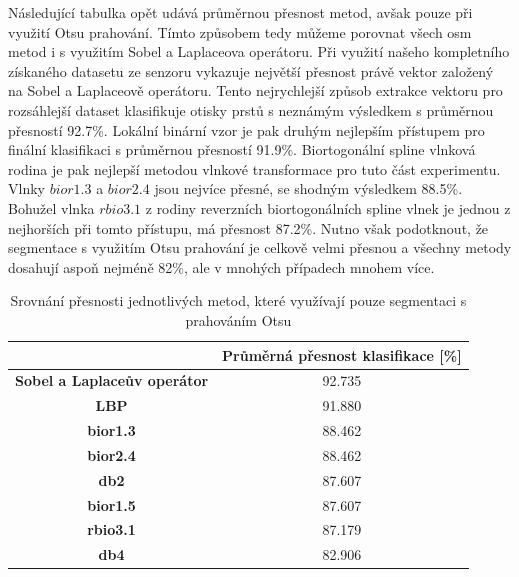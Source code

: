 Následující tabulka opět udává průměrnou přesnost metod, avšak pouze při využití Otsu prahování. Tímto způsobem tedy můžeme porovnat všech osm metod i s využitím Sobel a Laplaceova operátoru. Při využití našeho kompletního získaného datasetu ze senzoru vykazuje největší přesnost právě vektor založený na Sobel a Laplaceově operátoru. Tento nejrychlejší způsob extrakce vektoru pro rozsáhlejší dataset klasifikuje otisky prstů s neznámým výsledkem s průměrnou přesností 92.7\%. Lokální binární vzor je pak druhým nejlepším přístupem pro finální klasifikaci s průměrnou přesností 91.9\%. Biortogonální spline vlnková rodina je pak nejlepší metodou vlnkové transformace pro tuto část experimentu. Vlnky $bior1.3$ a $bior2.4$ jsou nejvíce přesné, se shodným výsledkem 88.5\%. Bohužel vlnka $rbio3.1$ z rodiny reverzních biortogonálních spline vlnek je jednou z nejhorších při tomto přístupu, má přesnost 87.2\%. Nutno však podotknout, že segmentace s využitím Otsu prahování je celkově velmi přesnou a všechny metody dosahují aspoň nejméně 82\%, ale v mnohých případech mnohem více.

\capstartfalse
\begin{table}[!htbp]
\centering
\begin{tabular}{|c|c|}
\hline
                                    & \textbf{Průměrná přesnost klasifikace {[}\%{]}} \\ \hline
\textbf{Sobel a Laplaceův operátor}                        & 92.735                                         \\ \hline
\textbf{LBP}                    & 91.880                                         \\ \hline
\textbf{bior1.3}                    & 88.462                                         \\ \hline
\textbf{bior2.4} & 88.462                                         \\ \hline
\textbf{db2}                    & 87.607                                         \\ \hline
\textbf{bior1.5}                        & 87.607                                       \\ \hline
\textbf{rbio3.1}                        & 87.179                                         \\ \hline
\textbf{db4}                    & 82.906                                         \\ \hline
\end{tabular}
\caption{Srovnání přesnosti jednotlivých metod, které využívají pouze segmentaci s prahováním Otsu}
\end{table}
\capstarttrue

